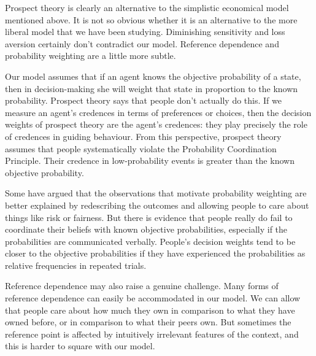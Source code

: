 Prospect theory is clearly an alternative to the simplistic economical model
mentioned above. It is not so obvious whether it is an alternative to the more
liberal model that we have been studying. Diminishing sensitivity and loss
aversion certainly don't contradict our model. Reference dependence and
probability weighting are a little more subtle.

Our model assumes that if an agent knows the objective probability of a state,
then in decision-making she will weight that state in proportion to the known
probability. Prospect theory says that people don't actually do this. If we
measure an agent's credences in terms of preferences or choices, then the
decision weights of prospect theory are the agent's credences: they play
precisely the role of credences in guiding behaviour. From this perspective,
prospect theory assumes that people systematically violate the Probability
Coordination Principle. Their credence in low-probability events is greater than
the known objective probability.

Some have argued that the observations that motivate probability weighting are
better explained by redescribing the outcomes and allowing people to care about
things like risk or fairness. But there is evidence that people really do fail
to coordinate their beliefs with known objective probabilities, especially if
the probabilities are communicated verbally.  People's decision weights
tend to be closer to the objective probabilities if they have experienced the
probabilities as relative frequencies in repeated trials.%



Reference dependence may also raise a genuine challenge. Many forms of reference
dependence can easily be accommodated in our model. We can allow that people
care about how much they own in comparison to what they have owned before, or in
comparison to what their peers own. But sometimes the reference point is
affected by intuitively irrelevant features of the context, and this is harder
to square with our model.


